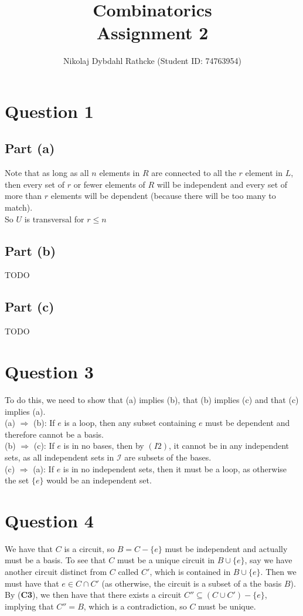 \documentclass[a4paper, fleqn]{article}
\author{Nikolaj Dybdahl Rathcke (Student ID: 74763954)}
\title{Combinatorics \\ Assignment 2}
\begin{document}
\maketitle

\section*{Question 1}
\subsection*{Part (a)}
Note that as long as all $n$ elements in $R$ are connected to all the $r$ element in $L$,
then every set of $r$ or fewer elements of $R$ will be independent and every set of more
than $r$ elements will be dependent (because there will be too many to match). \\
So $U$ is transversal for $r\leq n$

\subsection*{Part (b)}
TODO

\subsection*{Part (c)}
TODO

\section*{Question 3}
To do this, we need to show that (a) implies (b), that (b) implies (c) and that (c) implies (a).\\
(a) $\Rightarrow$ (b): If $e$ is a loop, then any subset containing $e$ must be dependent and therefore cannot be a basis. \\
(b) $\Rightarrow$ (c): If $e$ is in no bases, then by $(I2)$, it cannot be in any independent sets, as all independent sets in $\mathcal{I}$ are subsets of the bases. \\
(c) $\Rightarrow$ (a): If $e$ is in no independent sets, then it must be a loop, as otherwise the set $\{e\}$ would be an independent set.

\section*{Question 4}
We have that $C$ is a circuit, so $B=C-\{e\}$ must be independent and actually must be a
basis. To see that $C$ must be a unique circuit in $B\cup \{e\}$, say we have another
circuit distinct from $C$ called $C'$, which is contained in $B\cup \{e\}$. Then we must
have that $e\in C\cap C'$ (as otherwise, the circuit is a subset of a the basis $B$). By
(\textbf{C3}), we then have that there exists a circuit $C''\subseteq (C\cup C')-\{e\}$,
implying that $C''=B$, which is a contradiction, so $C$ must be unique.
\end{document}

